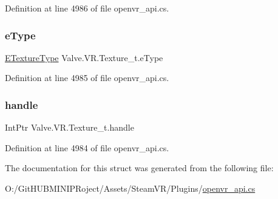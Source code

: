 Definition at line 4986 of file openvr\+\_\+api.\+cs.

\mbox{\label{struct_valve_1_1_v_r_1_1_texture__t_ad7b4a7326e0b7ffe2d129c3fbfa66dd3}} 
\subsubsection{\texorpdfstring{eType}{eType}}
{\footnotesize\ttfamily \mbox{\hyperlink{namespace_valve_1_1_v_r_a9481de640e411eef49c2f3fdca82eaa3}{E\+Texture\+Type}} Valve.\+V\+R.\+Texture\+\_\+t.\+e\+Type}



Definition at line 4985 of file openvr\+\_\+api.\+cs.

\mbox{\label{struct_valve_1_1_v_r_1_1_texture__t_a8b544ad2cfd49e3b272886c684e405cf}} 
\subsubsection{\texorpdfstring{handle}{handle}}
{\footnotesize\ttfamily Int\+Ptr Valve.\+V\+R.\+Texture\+\_\+t.\+handle}



Definition at line 4984 of file openvr\+\_\+api.\+cs.



The documentation for this struct was generated from the following file\+:\begin{DoxyCompactItemize}
\item 
O\+:/\+Git\+H\+U\+B\+M\+I\+N\+I\+P\+Roject/\+Assets/\+Steam\+V\+R/\+Plugins/\mbox{\hyperlink{openvr__api_8cs}{openvr\+\_\+api.\+cs}}\end{DoxyCompactItemize}
